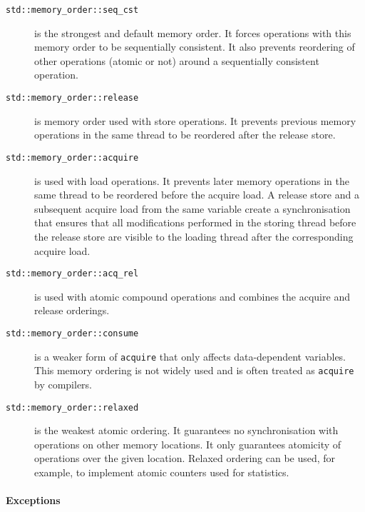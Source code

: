 \begin{description}
    \item[\texttt{std::memory\_order::seq\_cst}] is the strongest and default
        memory order.
        It forces operations with this memory order to be sequentially
        consistent.
        It also prevents reordering of other operations (atomic or not) around
        a sequentially consistent operation.

    \item[\texttt{std::memory\_order::release}] is memory order used with store
        operations.
        It prevents previous memory operations in the same thread to be
        reordered after the release store.

    \item[\texttt{std::memory\_order::acquire}] is used with load operations.
        It prevents later memory operations in the same thread to be reordered
        before the acquire load.
        A release store and a subsequent acquire load from the same variable
        create a synchronisation that ensures that all modifications
        performed in the storing thread before the release store are
        visible to the loading thread after the corresponding acquire load.

    \item[\texttt{std::memory\_order::acq\_rel}] is used with atomic
        compound operations and combines the acquire and release orderings.

    \item[\texttt{std::memory\_order::consume}] is a weaker form of
        \texttt{acquire} that only affects data-dependent variables.
        This memory ordering is not widely used and is often treated as
        \texttt{acquire} by compilers.

    \item[\texttt{std::memory\_order::relaxed}] is the weakest atomic
        ordering.
        It guarantees no synchronisation with operations on other memory
        locations.
        It only guarantees atomicity of operations over the given location.
        Relaxed ordering can be used, for example, to implement atomic counters
        used for statistics.
\end{description}

\paragraph{Exceptions}

